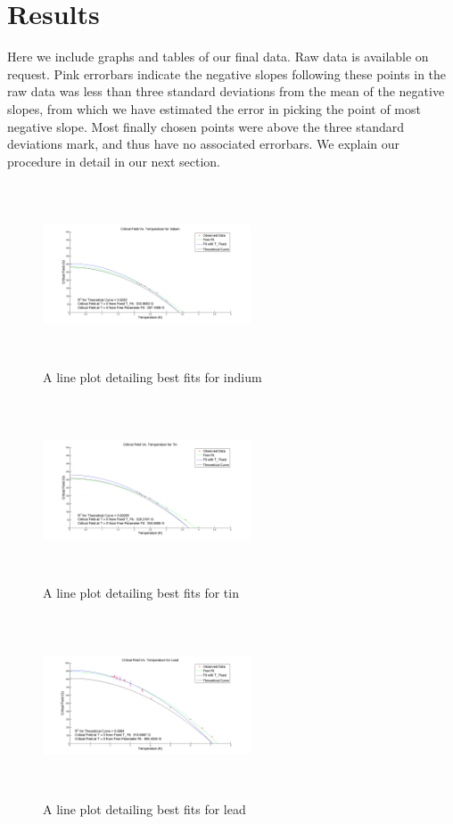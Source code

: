 \documentclass[aps,prl,nofootinbib,twocolumn,superscriptaddress,groupedaddress]{revtex4}  %
\begin{document}
\section{Results}

Here we include graphs and tables of our final data. Raw data is available on request. Pink errorbars indicate the negative slopes following these points in the raw data was less than three standard deviations from the mean of the negative slopes, from which we have estimated the error in picking the point of most negative slope. Most finally chosen points were above the three standard deviations mark, and thus have no associated errorbars. We explain our procedure in detail in our next section.

\begin{figure}
\includegraphics[width = 0.55\textwidth, right, height = 5.4cm]{../Analysis/IndiumFieldVsTempPicture.png}
\caption{A line plot detailing best fits for indium} 
\end{figure}

\begin{figure}
\centering
\includegraphics[width = 0.55\textwidth, right, height = 5.4cm]{../Analysis/TinFieldVsTempPicture.png}
\caption{A line plot detailing best fits for tin} 
\end{figure}

\begin{figure}
\centering
\includegraphics[width = 0.55\textwidth, right, height = 5.4cm]{../Analysis/LeadFieldVsTempPicture.png}
\caption{A line plot detailing best fits for lead} 
\end{figure}
\end{document}
